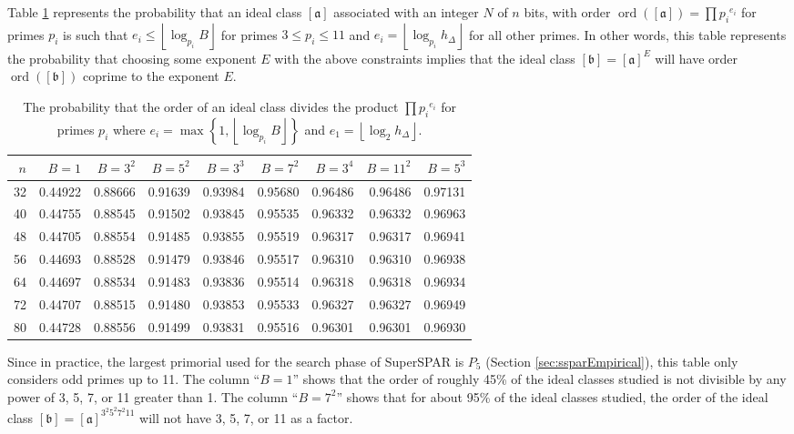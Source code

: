 \documentclass{ucalgthes1}
\theoremstyle{definition}
\DeclareMathOperator{\ord}{ord}
\newcommand{\floor}[1]{\left\lfloor #1 \right\rfloor}
\newcommand{\ideal}{\mathfrak}
\newcommand{\idealclass}[1]{\left[ \ideal #1 \right]}
\newcommand{\aclass}{\idealclass a}
\newcommand{\bclass}{\idealclass b}
\begin{document}
Table \ref{tab:primePowerBound} represents the probability that an ideal class $\aclass$ associated with an integer $N$ of $n$ bits, with order $\ord(\aclass) = \prod {p_i}^{e_i}$ for primes $p_i$ is such that $e_i \le \floor{\log_{p_i} B}$ for primes $3 \le p_i \le 11$ and $e_i = \floor{\log_{p_i} h_\Delta}$ for all other primes.  In other words, this table represents the probability that choosing some exponent $E$ with the above constraints implies that the ideal class $\bclass = \aclass ^E$ will have order $\ord(\bclass)$ coprime to the exponent $E$.

\begin{table}[h]
\centering
\begin{tabular}{| r | r | r | r | r | r | r | r | r |}
	\hline
	$n$ & $B=1$ & $B=3^2$ & $B=5^2$ & $B=3^3$ & $B=7^2$ & $B=3^4$ & $B=11^2$ & $B=5^3$ \\
	\hline
32 & 0.44922 & 0.88666 & 0.91639 & 0.93984 & 0.95680 & 0.96486 & 0.96486 & 0.97131 \\
40 & 0.44755 & 0.88545 & 0.91502 & 0.93845 & 0.95535 & 0.96332 & 0.96332 & 0.96963 \\
48 & 0.44705 & 0.88554 & 0.91485 & 0.93855 & 0.95519 & 0.96317 & 0.96317 & 0.96941 \\
56 & 0.44693 & 0.88528 & 0.91479 & 0.93846 & 0.95517 & 0.96310 & 0.96310 & 0.96938 \\
64 & 0.44697 & 0.88534 & 0.91483 & 0.93836 & 0.95514 & 0.96318 & 0.96318 & 0.96934 \\
72 & 0.44707 & 0.88515 & 0.91480 & 0.93853 & 0.95533 & 0.96327 & 0.96327 & 0.96949 \\
80 & 0.44728 & 0.88556 & 0.91499 & 0.93831 & 0.95516 & 0.96301 & 0.96301 & 0.96930 \\	
	\hline
\end{tabular}
\caption{The probability that the order of an ideal class divides the product $\prod {p_i}^{e_i}$ for primes $p_i$ where $e_i = \max \left\{ 1, \floor{\log_{p_i} B} \right\}$ and $e_1 = \floor{\log_2 h_\Delta}$.}
\label{tab:primePowerBound}
\end{table}

Since in practice, the largest primorial used for the search phase of SuperSPAR is $P_5$ (Section \ref{sec:ssparEmpirical}), this table only considers odd primes up to 11.  The column ``$B=1$'' shows that the order of roughly 45\% of the ideal classes studied is not divisible by any power of 3, 5, 7, or 11 greater than 1.  The column ``$B=7^2$'' shows that for about 95\% of the ideal classes studied, the order of the ideal class $\bclass = \aclass^{3^2 5^2 7^2 11}$ will not have 3, 5, 7, or 11 as a factor.  
\end{document}
